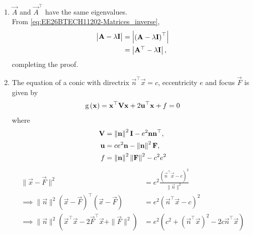 \begin{enumerate}[label=\thesubsection.\arabic*, ref=\thesubsection.\theenumi]
\begin{align}
\prod_{i=1}^n \brak{\lambda - a_{ii}} = \lambda^n - \brak{\sum_{i=1}^n a_{ii}} \lambda^{n-1} + \dots \label{eq:EE26BTECH11213-diagonal_expansion}
\end{align}
where $a_{ii}$ denotes the diagonal elements of $\vec{A}$.
Equating the coefficient of $\lambda^{n-1}$ from \eqref{eq:EE26BTECH11213-char_poly_factored} and \eqref{eq:EE26BTECH11213-diagonal_expansion} yields 
	\eqref{eq:EE26BTECH11202-Matrices_2}
 From \eqref{eq:EE26BTECH11213-char_poly_det},
\begin{align}
p_{\vec{A}}\brak{0} = 
 \prod_{i=1}^n \lambda_i
=\mydet{\vec{A}} 
\end{align}
\item $\vec{A}$ and $\vec{A}^{\top}$ have the same eigenvalues.
	\\
	\solution From  \eqref{eq:EE26BTECH11202-Matrices_inverse},
\begin{align}
\begin{vmatrix}\mathbf{A} - \lambda \mathbf{I}\end{vmatrix}
&=
\begin{vmatrix}\left(\mathbf{A} - \lambda \mathbf{I}\right)^{\top}\end{vmatrix}
\\
&=
\begin{vmatrix}\mathbf{A}^{\top} - \lambda \mathbf{I}\end{vmatrix},
\end{align}
completing the proof.
\item
The equation of  a conic with directrix $\vec{n}^{\top}\vec{x} = c$, eccentricity $e$ and focus $\vec{F}$ is given by 
\begin{align}
    \label{eq:EE26BTECH11202-app-conic_quad_form}
	\text{g}\left(\mathbf{x}\right) = \mathbf{x}^{\top}\mathbf{V}\mathbf{x}+2\mathbf{u}^{\top}\mathbf{x}+f=0
    \end{align}
where     
\begin{align}
  \label{eq:EE26BTECH11202-app-conic_quad_form_v}
\mathbf{V} &=\left\lVert\mathbf{n}\right\rVert^2\mathbf{I}-e^2\mathbf{n}\mathbf{n}^{\top}, 
\\
\label{eq:EE26BTECH11202-app-conic_quad_form_u}
\mathbf{u} &= ce^2\mathbf{n}-\left\lVert\mathbf{n}\right\rVert^2\mathbf{F}, 
\\
\label{eq:EE26BTECH11202-app-conic_quad_form_f}
f &= \left\lVert\mathbf{n}\right\rVert^2\left\lVert\mathbf{F}\right\rVert^2-c^2e^2
    \end{align}
\solution
\begin{align}
\|\vec{x} - \vec{F}\|^2 &= e^2 \frac{(\vec{n}^\top \vec{x} - c)^2}{\|\vec{n}\|^2} 
\\
\implies \|\vec{n}\|^2 (\vec{x} - \vec{F})^\top (\vec{x} - \vec{F}) &= e^2 \left(\vec{n}^\top \vec{x} - c\right)^2 
\\
\implies \|\vec{n}\|^2 \left(\vec{x}^\top \vec{x} - 2\vec{F}^\top \vec{x} + \|\vec{F}\|^2\right) &= e^2 \left(c^2 + \left(\vec{n}^\top \vec{x}\right)^2 - 2c\vec{n}^\top \vec{x}\right) 

\end{align}
\end{enumerate}
